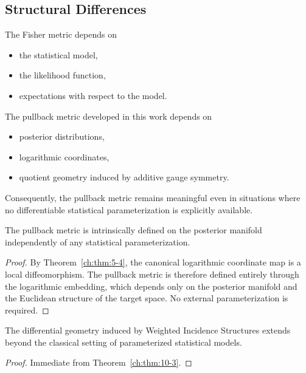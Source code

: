 \subsection{Structural Differences}\label{ch:sec:structural-differences}
The Fisher metric depends on
\begin{itemize}
\item the statistical model,
\item the likelihood function,
\item expectations with respect to the model.
\end{itemize}
The pullback metric developed in this work depends on
\begin{itemize}
\item posterior distributions,
\item logarithmic coordinates,
\item quotient geometry induced by additive gauge symmetry.
\end{itemize}
Consequently, the pullback metric remains meaningful even in situations
where no differentiable statistical parameterization is explicitly
available.
\begin{theorem}\label{ch:thm:10-3}

The pullback metric is intrinsically defined on the posterior manifold
independently of any statistical parameterization.
\end{theorem}
\begin{proof}
By Theorem~\ref{ch:thm:5-4}, the canonical logarithmic coordinate map
is a local diffeomorphism.
The pullback metric is therefore defined entirely through
the logarithmic embedding, which depends only on the posterior manifold and the Euclidean structure
of the target space.
No external parameterization is required. 
\end{proof}

\begin{corollary}[Generality]
\label{ch:cor:10-4}
The differential geometry induced by Weighted Incidence Structures
extends beyond the classical setting of parameterized statistical
models.
\end{corollary}
\begin{proof}
Immediate from Theorem~\ref{ch:thm:10-3}. 
\end{proof}

